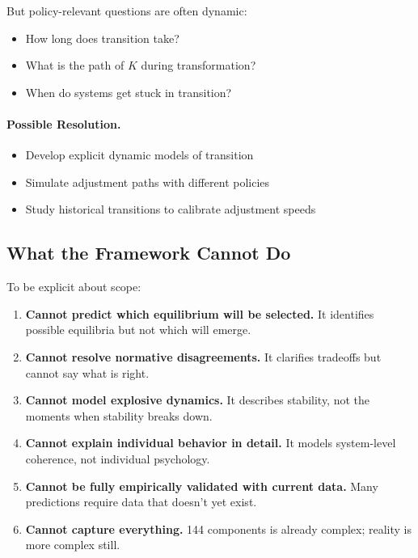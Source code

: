 But policy-relevant questions are often dynamic:
\begin{itemize}
  \item How long does transition take?
  \item What is the path of $K$ during transformation?
  \item When do systems get stuck in transition?
\end{itemize}

\paragraph{Possible Resolution.}
\begin{itemize}
  \item Develop explicit dynamic models of transition
  \item Simulate adjustment paths with different policies
  \item Study historical transitions to calibrate adjustment speeds
\end{itemize}

\subsection{What the Framework Cannot Do}

To be explicit about scope:

\begin{enumerate}
  \item \textbf{Cannot predict which equilibrium will be selected.}
        It identifies possible equilibria but not which will emerge.
  
  \item \textbf{Cannot resolve normative disagreements.}
        It clarifies tradeoffs but cannot say what is right.
  
  \item \textbf{Cannot model explosive dynamics.}
        It describes stability, not the moments when stability breaks down.
  
  \item \textbf{Cannot explain individual behavior in detail.}
        It models system-level coherence, not individual psychology.
  
  \item \textbf{Cannot be fully empirically validated with current data.}
        Many predictions require data that doesn't yet exist.
  
  \item \textbf{Cannot capture everything.}
        144 components is already complex; reality is more complex still.
\end{enumerate}

